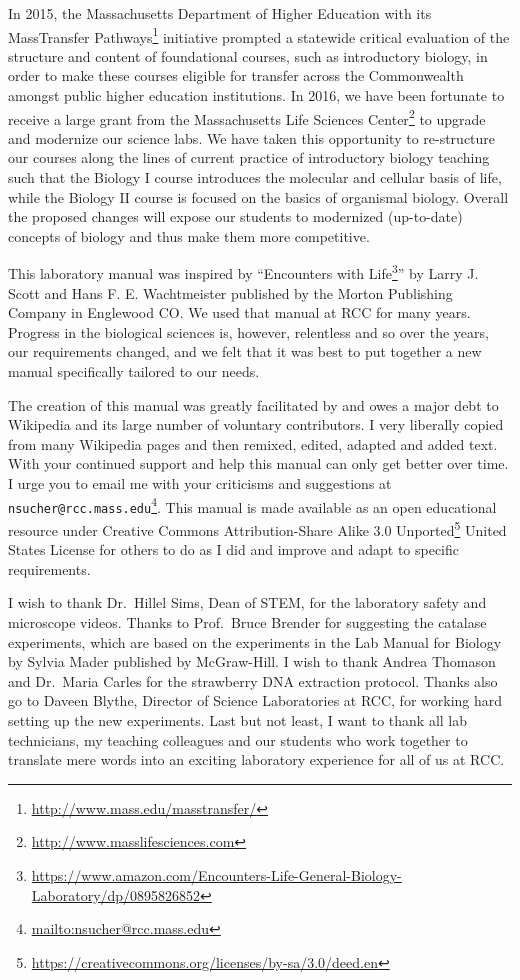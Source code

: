 \documentclass[]{book}
\let\rmarkdownfootnote\footnote%
\def\footnote{\protect\rmarkdownfootnote}
\renewcommand{\href}[2]{#2\footnote{\url{#1}}}
\begin{document}
In 2015, the Massachusetts Department of Higher Education with its \href{http://www.mass.edu/masstransfer/}{MassTransfer Pathways} initiative prompted a statewide critical evaluation of the structure and content of foundational courses, such as introductory biology, in order to make these courses eligible for transfer across the Commonwealth amongst public higher education institutions. In 2016, we have been fortunate to receive a large grant from the \href{http://www.masslifesciences.com}{Massachusetts Life Sciences Center} to upgrade and modernize our science labs. We have taken this opportunity to re-structure our courses along the lines of current practice of introductory biology teaching such that the Biology I course introduces the molecular and cellular basis of life, while the Biology II course is focused on the basics of organismal biology. Overall the proposed changes will expose our students to modernized (up-to-date) concepts of biology and thus make them more competitive.

This laboratory manual was inspired by ``\href{https://www.amazon.com/Encounters-Life-General-Biology-Laboratory/dp/0895826852}{Encounters with Life}'' by Larry J. Scott and Hans F. E. Wachtmeister published by the Morton Publishing Company in Englewood CO. We used that manual at RCC for many years. Progress in the biological sciences is, however, relentless and so over the years, our requirements changed, and we felt that it was best to put together a new manual specifically tailored to our needs.

The creation of this manual was greatly facilitated by and owes a major debt to Wikipedia and its large number of voluntary contributors. I very liberally copied from many Wikipedia pages and then remixed, edited, adapted and added text. With your continued support and help this manual can only get better over time. I urge you to email me with your criticisms and suggestions at \href{mailto:nsucher@rcc.mass.edu}{\nolinkurl{nsucher@rcc.mass.edu}}. This manual is made available as an open educational resource under \href{https://creativecommons.org/licenses/by-sa/3.0/deed.en}{Creative Commons Attribution-Share Alike 3.0 Unported} United States License for others to do as I did and improve and adapt to specific requirements.

I wish to thank Dr.~Hillel Sims, Dean of STEM, for the laboratory safety and microscope videos. Thanks to Prof.~Bruce Brender for suggesting the catalase experiments, which are based on the experiments in the Lab Manual for Biology by Sylvia Mader published by McGraw-Hill. I wish to thank Andrea Thomason and Dr.~Maria Carles for the strawberry DNA extraction protocol. Thanks also go to Daveen Blythe, Director of Science Laboratories at RCC, for working hard setting up the new experiments. Last but not least, I want to thank all lab technicians, my teaching colleagues and our students who work together to translate mere words into an exciting laboratory experience for all of us at RCC.
\end{document}
